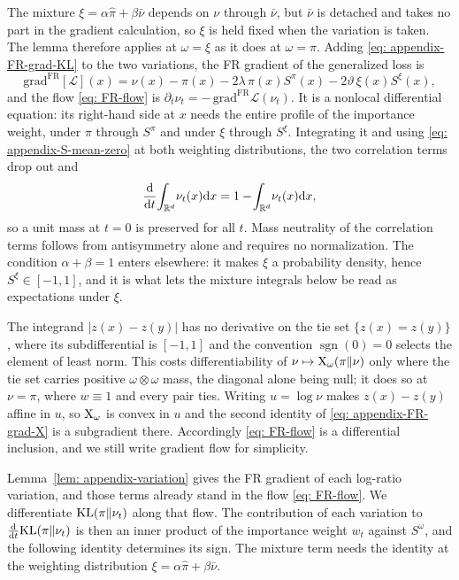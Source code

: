 \documentclass{article}
\begin{document}
The mixture $\xi=\alpha\hat\pi+\beta\bar\nu$ depends on $\nu$ through $\bar\nu$, but $\bar\nu$ is detached and takes no part in the gradient calculation, so $\xi$ is held fixed when the variation is taken. The lemma therefore applies at $\omega=\xi$ as it does at $\omega=\pi$. Adding \eqref{eq: appendix-FR-grad-KL} to the two variations, the FR gradient of the generalized loss is
\begin{equation*}
    \mathrm{grad}^{\mathrm{FR}}[\mathcal L](x) = \nu(x)-\pi(x) - 2\lambda\,\pi(x)S^{\pi}(x) - 2\vartheta\,\xi(x)S^{\xi}(x) ,
\end{equation*}
and the flow \eqref{eq: FR-flow} is $\partial_t\nu_t=-\,\mathrm{grad}^{\mathrm{FR}}\mathcal L(\nu_t)$. It is a nonlocal differential equation: its right-hand side at $x$ needs the entire profile of the importance weight, under $\pi$ through $S^{\pi}$ and under $\xi$ through $S^{\xi}$. Integrating it and using \eqref{eq: appendix-S-mean-zero} at both weighting distributions, the two correlation terms drop out and
\begin{equation*}
    \frac{\mathrm{d}}{\mathrm{d} t}\!\int_{\mathbb R^d}\!\nu_t(x)\mathrm{d} x = 1 - \!\int_{\mathbb R^d}\!\nu_t(x)\mathrm{d} x ,
\end{equation*}
so a unit mass at $t=0$ is preserved for all $t$. Mass neutrality of the correlation terms follows from antisymmetry alone and requires no normalization. The condition $\alpha+\beta=1$ enters elsewhere: it makes $\xi$ a probability density, hence $S^{\xi}\in[-1,1]$, and it is what lets the mixture integrals below be read as expectations under $\xi$.

\begin{remark}
\label{rem: appendix-subgradient}
The integrand $|z(x)-z(y)|$ has no derivative on the tie set $\{z(x)=z(y)\}$, where its subdifferential is $[-1,1]$ and the convention $\operatorname{sgn}(0)=0$ selects the element of least norm. This costs differentiability of $\nu\mapsto\mathrm{X}_\omega(\pi\|\nu)$ only where the tie set carries positive $\omega\otimes\omega$ mass, the diagonal alone being null; it does so at $\nu=\pi$, where $w\equiv1$ and every pair ties. Writing $u=\log\nu$ makes $z(x)-z(y)$ affine in $u$, so $\mathrm{X}_\omega$ is convex in $u$ and the second identity of \eqref{eq: appendix-FR-grad-X} is a subgradient there. Accordingly \eqref{eq: FR-flow} is a differential inclusion, and we still write gradient flow for simplicity.
\end{remark}

Lemma~\ref{lem: appendix-variation} gives the FR gradient of each log-ratio variation, and those terms already stand in the flow \eqref{eq: FR-flow}. We differentiate $\mathrm{KL}(\pi\|\nu_t)$ along that flow. The contribution of each variation to $\frac{\mathrm{d}}{\mathrm{d} t}\mathrm{KL}(\pi\|\nu_t)$ is then an inner product of the importance weight $w_t$ against $S^{\omega}$, and the following identity determines its sign. The mixture term needs the identity at the weighting distribution $\xi=\alpha\hat\pi+\beta\bar\nu$.
\end{document}
